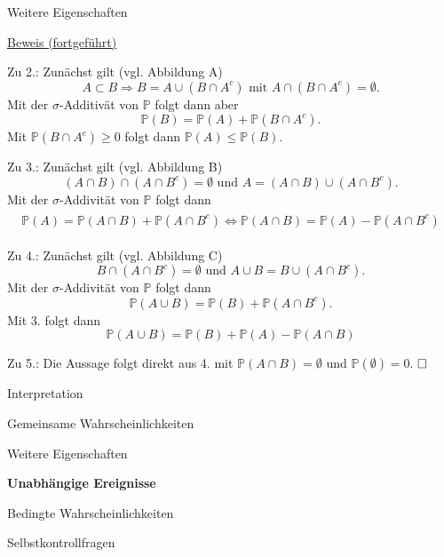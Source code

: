 \documentclass[
  8pt,
  ignorenonframetext,
]{beamer}
\begin{document}
\begin{frame}{Weitere Eigenschaften}
\protect\hypertarget{weitere-eigenschaften-2}{}
\footnotesize
{}

\underline{Beweis (fortgeführt)}

Zu 2.: Zunächst gilt (vgl. Abbildung A) \begin{equation}
A \subset B \Rightarrow B = A \cup (B \cap A^c)
\mbox{ mit } A \cap (B \cap A^c) = \emptyset.
\end{equation} Mit der \(\sigma\)-Additivät von \(\mathbb{P}\) folgt
dann aber \begin{equation}
\mathbb{P}(B) = \mathbb{P}(A) + \mathbb{P}(B \cap A^c).
\end{equation} Mit \(\mathbb{P}(B \cap A^c) \ge 0\) folgt dann
\(\mathbb{P}(A) \le \mathbb{P}(B)\).

Zu 3.: Zunächst gilt (vgl. Abbildung B) \begin{equation}
(A \cap B) \cap (A \cap B^c)  = \emptyset
\mbox{ und } A  = (A \cap B) \cup (A \cap B^c).
\end{equation} Mit der \(\sigma\)-Addivität von \(\mathbb{P}\) folgt
dann \begin{align}
\begin{split}
\mathbb{P}(A) = \mathbb{P}(A \cap B) + \mathbb{P}(A \cap B^c)
\Leftrightarrow
\mathbb{P}(A \cap B)
= \mathbb{P}(A) - \mathbb{P}(A \cap B^c)
\end{split}
\end{align}

Zu 4.: Zunächst gilt (vgl. Abbildung C) \begin{equation}
B \cap (A \cap B^c)  = \emptyset
\mbox{ und } A \cup B = B \cup (A \cap B^c).
\end{equation} Mit der \(\sigma\)-Addivität von \(\mathbb{P}\) folgt
dann \begin{equation}
\mathbb{P}(A \cup B) = \mathbb{P}(B) + \mathbb{P}(A \cap B^c).
\end{equation} Mit 3. folgt dann \begin{equation}
\mathbb{P}(A \cup B) = \mathbb{P}(B) + \mathbb{P}(A) - \mathbb{P}(A \cap B)
\end{equation}

Zu 5.: Die Aussage folgt direkt aus 4. mit
\(\mathbb{P}(A \cap B) = \emptyset\) und \(\mathbb{P}(\emptyset) = 0\).
\(\hfill\Box\)
\end{frame}

\begin{frame}{}
\protect\hypertarget{section-8}{}
\vfill
\large

Interpretation

Gemeinsame Wahrscheinlichkeiten

Weitere Eigenschaften

\textbf{Unabhängige Ereignisse}

Bedingte Wahrscheinlichkeiten

Selbstkontrollfragen \vfill
\end{frame}
\end{document}
